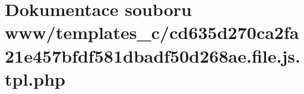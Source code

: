 \section{Dokumentace souboru www/templates\_\-c/cd635d270ca2fa21e457bfdf581dbadf50d268ae.file.js.tpl.php}
\label{d5/d62/cd635d270ca2fa21e457bfdf581dbadf50d268ae_8file_8js_8tpl_8php}
